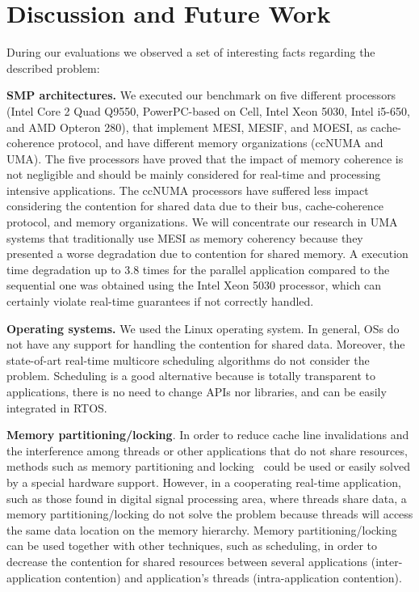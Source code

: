 \documentclass[conference]{IEEEtran}
\begin{document}
\section{Discussion and Future Work}
\label{sec:disc}
During our evaluations we observed a set of interesting facts regarding the described problem:

\textbf{SMP architectures.} We executed our benchmark on five different processors (Intel Core 2 Quad Q9550, PowerPC-based on Cell, Intel Xeon 5030, Intel i5-650, and AMD Opteron 280), that implement MESI, MESIF, and MOESI, as cache-coherence protocol, and have different memory organizations (ccNUMA and UMA). The five processors have proved that the impact of memory coherence is not negligible and should be mainly considered for real-time and processing intensive applications. The ccNUMA processors have suffered less impact considering the contention for shared data due to their bus, cache-coherence protocol, and memory organizations. We will concentrate our research in UMA systems that traditionally use MESI as memory coherency because they presented a worse degradation due to contention for shared memory. A execution time degradation up to 3.8 times for the parallel application compared to the sequential one was obtained using the Intel Xeon 5030 processor, which can certainly violate real-time guarantees if not correctly handled.

\textbf{Operating systems.} 
We used the Linux operating system. In general, OSs do not have any support for handling the contention for shared data. Moreover, the state-of-art real-time multicore scheduling algorithms do not consider the problem. Scheduling is a good alternative because is totally transparent to applications, there is no need to change APIs nor libraries, and can be easily integrated in RTOS.

\textbf{Memory partitioning/locking}. 
In order to reduce cache line invalidations and the interference among threads or other applications that do not share resources, methods such as memory partitioning and locking~\cite{Suhendra2008, Muralidhara:2010} could be used or easily solved by a special hardware support. However, in a cooperating real-time application, such as those found in digital signal processing area, where threads share data, a memory partitioning/locking do not solve the problem because threads will access the same data location on the memory hierarchy. Memory partitioning/locking can be used together with other techniques, such as scheduling, in order to decrease the contention for shared resources between several applications (inter-application contention) and application's threads (intra-application contention).
\end{document}
